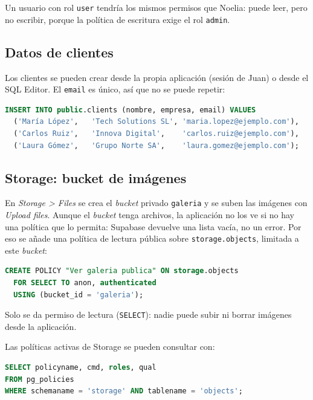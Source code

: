 \documentclass[a4paper, 12pt]{article}
\begin{document}
Un usuario con rol \texttt{user} tendría los mismos permisos que Noelia: puede
leer, pero no escribir, porque la política de escritura exige el rol
\texttt{admin}.

\subsection{Datos de clientes}

Los clientes se pueden crear desde la propia aplicación (sesión de Juan) o
desde el SQL Editor. El \texttt{email} es único, así que no se puede repetir:

\begin{lstlisting}[language=SQL, caption={Inserción de clientes de ejemplo}]
INSERT INTO public.clients (nombre, empresa, email) VALUES
  ('María López',   'Tech Solutions SL', 'maria.lopez@ejemplo.com'),
  ('Carlos Ruiz',   'Innova Digital',    'carlos.ruiz@ejemplo.com'),
  ('Laura Gómez',   'Grupo Norte SA',    'laura.gomez@ejemplo.com');
\end{lstlisting}

\subsection{Storage: bucket de imágenes}

En \textit{Storage > Files} se crea el \textit{bucket} privado
\texttt{galeria} y se suben las imágenes con \textit{Upload files}. Aunque el
\textit{bucket} tenga archivos, la aplicación no los ve si no hay una
política que lo permita: Supabase devuelve una lista vacía, no un error. Por
eso se añade una política de lectura pública sobre \texttt{storage.objects},
limitada a este \textit{bucket}:

\begin{lstlisting}[language=SQL, caption={Política de lectura del bucket galeria}]
CREATE POLICY "Ver galeria publica" ON storage.objects
  FOR SELECT TO anon, authenticated
  USING (bucket_id = 'galeria');
\end{lstlisting}

Solo se da permiso de lectura (\texttt{SELECT}): nadie puede subir ni borrar
imágenes desde la aplicación.

Las políticas activas de Storage se pueden consultar con:

\begin{lstlisting}[language=SQL, caption={Consulta de las políticas de Storage}]
SELECT policyname, cmd, roles, qual
FROM pg_policies
WHERE schemaname = 'storage' AND tablename = 'objects';
\end{lstlisting}
\end{document}
